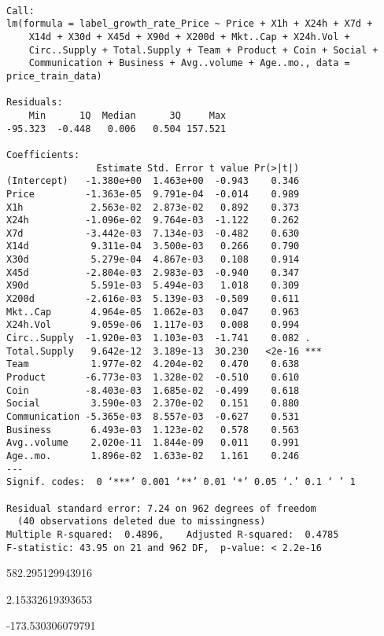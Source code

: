 \documentclass[11pt]{article}
\begin{document}
    \begin{verbatim}

Call:
lm(formula = label_growth_rate_Price ~ Price + X1h + X24h + X7d +
    X14d + X30d + X45d + X90d + X200d + Mkt..Cap + X24h.Vol +
    Circ..Supply + Total.Supply + Team + Product + Coin + Social +
    Communication + Business + Avg..volume + Age..mo., data = price_train_data)

Residuals:
    Min      1Q  Median      3Q     Max
-95.323  -0.448   0.006   0.504 157.521

Coefficients:
                Estimate Std. Error t value Pr(>|t|)
(Intercept)   -1.380e+00  1.463e+00  -0.943    0.346
Price         -1.363e-05  9.791e-04  -0.014    0.989
X1h            2.563e-02  2.873e-02   0.892    0.373
X24h          -1.096e-02  9.764e-03  -1.122    0.262
X7d           -3.442e-03  7.134e-03  -0.482    0.630
X14d           9.311e-04  3.500e-03   0.266    0.790
X30d           5.279e-04  4.867e-03   0.108    0.914
X45d          -2.804e-03  2.983e-03  -0.940    0.347
X90d           5.591e-03  5.494e-03   1.018    0.309
X200d         -2.616e-03  5.139e-03  -0.509    0.611
Mkt..Cap       4.964e-05  1.062e-03   0.047    0.963
X24h.Vol       9.059e-06  1.117e-03   0.008    0.994
Circ..Supply  -1.920e-03  1.103e-03  -1.741    0.082 .
Total.Supply   9.642e-12  3.189e-13  30.230   <2e-16 ***
Team           1.977e-02  4.204e-02   0.470    0.638
Product       -6.773e-03  1.328e-02  -0.510    0.610
Coin          -8.403e-03  1.685e-02  -0.499    0.618
Social         3.590e-03  2.370e-02   0.151    0.880
Communication -5.365e-03  8.557e-03  -0.627    0.531
Business       6.493e-03  1.123e-02   0.578    0.563
Avg..volume    2.020e-11  1.844e-09   0.011    0.991
Age..mo.       1.896e-02  1.633e-02   1.161    0.246
---
Signif. codes:  0 ‘***’ 0.001 ‘**’ 0.01 ‘*’ 0.05 ‘.’ 0.1 ‘ ’ 1

Residual standard error: 7.24 on 962 degrees of freedom
  (40 observations deleted due to missingness)
Multiple R-squared:  0.4896,	Adjusted R-squared:  0.4785
F-statistic: 43.95 on 21 and 962 DF,  p-value: < 2.2e-16

    \end{verbatim}


    \begin{enumerate*}
\item 582.295129943916
\item 2.15332619393653
\item -173.530306079791
\end{enumerate*}
\end{document}

